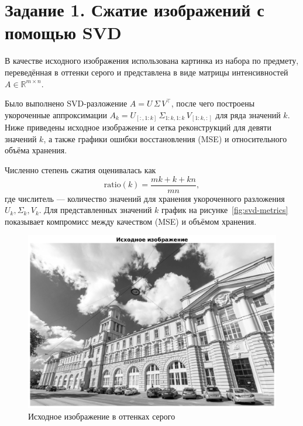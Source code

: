 \section*{Задание 1. Сжатие изображений с помощью SVD}

В качестве исходного изображения использована картинка из набора по предмету, переведённая в оттенки серого и представлена в виде матрицы интенсивностей \(A\in\mathbb{R}^{m\times n}\).

Было выполнено SVD-разложение \(A = U\,\Sigma\,V^\top\), после чего построены укороченные аппроксимации \(A_k = U_{[:,1:k]}\,\Sigma_{1:k,1:k}\,V_{[1:k,:]}\) для ряда значений \(k\). Ниже приведены исходное изображение и сетка реконструкций для девяти значений \(k\), а также графики ошибки восстановления (MSE) и относительного объёма хранения.

Численно степень сжатия оценивалась как
\[ \text{ratio}(k) = \frac{m k + k + k n}{m n}, \]
где числитель — количество значений для хранения укороченного разложения \(U_k,\Sigma_k,V_k\). Для представленных значений \(k\) график на рисунке~\ref{fig:svd-metrics} показывает компромисс между качеством (MSE) и объёмом хранения.

\begin{figure}[h!]
  \centering
  \includegraphics[width=0.6\linewidth]{images/task1/svd_original.png}
  \caption{Исходное изображение в оттенках серого}
  \label{fig:svd-original}
\end{figure}

